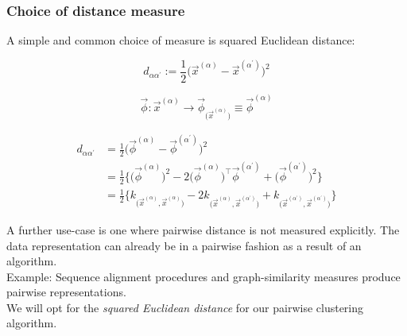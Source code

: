 \begin{frame}\frametitle{Choice of distance measure}

A simple and common choice of measure is squared Euclidean distance:

\begin{equation}
\label{eq:pairwisedisteuclidean}
d_{\alpha \alpha^{'}} := \frac{1}{2} \big(
    \vec{x}^{(\alpha)} - \vec{x}^{(\alpha^{'})} \big)^2
\end{equation}


$$
          \vec{\phi}: \vec{x}^{(\alpha)} \rightarrow
          \vec{\phi}_{\big( \vec{x}^{(\alpha)} \big)}
          \equiv \vec{\phi}^{(\alpha)}
$$

\begin{align}
			d_{\alpha \alpha^{'}} 
			& = \frac{1}{2} \big( \vec{\phi}^{(\alpha)} 
				- \vec{\phi}^{(\alpha^{'})} \big)^2 \\
			& = \frac{1}{2} \Big\{ \big( \vec{\phi}^{(\alpha)}
				\big)^2 - 2\big( \vec{\phi}^{(\alpha)} \big)^\top
				\vec{\phi}^{(\alpha^{'})} + \big(
				\vec{\phi}^{(\alpha^{'})} \big)^2 \Big\} \\
			& = \frac{1}{2} \bigg\{ k_{\big( \vec{x}^{(\alpha)},
				\vec{x}^{(\alpha)} \big)} 
				- 2k_{\big(\vec{x}^{(\alpha)},
				\vec{x}^{(\alpha^{'})} \big)}
				+ k_{\big(\vec{x}^{(\alpha^{'})},
				\vec{x}^{(\alpha^{'})} \big)}
				\bigg\}
\end{align}

\end{frame}

\begin{frame}

A further use-case is one where pairwise distance is not measured explicitly. The data representation can already be in a pairwise fashion as a result of an algorithm.\\
Example: Sequence alignment procedures and graph-similarity measures produce pairwise representations.\\

We will opt for the \emph{squared Euclidean distance} for our pairwise clustering algorithm.

\end{frame}


